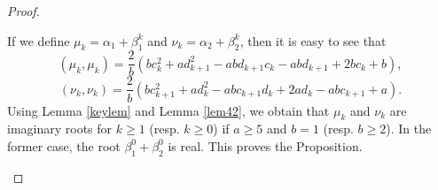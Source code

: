 \documentclass[12pt,reqno]{amsart}
\theoremstyle{plain}
\newtheorem{lem}{Lemma}
\theoremstyle{definition}
\theoremstyle{remark}
\begin{document}
\begin{proof}
\begin{enumerate}
\begin{enumerate}
    \end{enumerate}
    If we define $\mu_k=\alpha_1+\beta_1^k$ and $\nu_k=\alpha_2+\beta_2^k$, then it is easy to see that 
    $$(\mu_k,\mu_k)=\frac{2}{b}(bc_k^2+ad_{k+1}^2-abd_{k+1}c_k-abd_{k+1}+2bc_k+b),$$
    $$(\nu_k,\nu_k)=\frac{2}{b}(bc_{k+1}^2+ad_k^2-abc_{k+1}d_k+2ad_k-abc_{k+1}+a).$$
    Using Lemma \ref{keylem} and Lemma \ref{lem42}, we obtain that $\mu_k$ and $\nu_k$ are imaginary roots for $k\geq 1$ (resp. $k\geq 0$) if $a\geq 5$ and $b=1$ (resp. $b\geq 2$). In the former case, the root $\beta_1^0+\beta_2^0$ is real. This proves the Proposition.
\end{enumerate}
\end{proof}
\iffalse
\vspace{1in}

\end{document}
